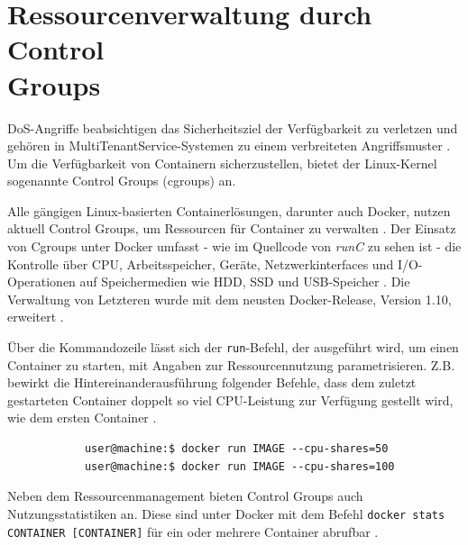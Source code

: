 \documentclass[../main.tex]{subfiles}
\begin{document}
	\section{Ressourcenverwaltung durch Control\\Groups}
  \label{secCgroups}
		\acrshort{DoS}-Angriffe beabsichtigen das Sicherheitsziel der Verfügbarkeit zu verletzen und gehören in \gls{MultiTenantService}-Systemen zu einem verbreiteten Angriffsmuster \cite[S.5]{dockerSec1}. Um die Verfügbarkeit von Containern sicherzustellen, bietet der Linux-Kernel sogenannte Control Groups (\acrshort{cgroups}) an.

		Alle gängigen Linux-basierten Containerlösungen, darunter auch Docker, nutzen aktuell Control Groups, um Ressourcen für Container zu verwalten \cite[S.16]{dockerSec2}. Der Einsatz von Cgroups unter Docker umfasst - wie im Quellcode von \emph{runC} zu sehen ist - die Kontrolle über \acrshort{CPU}, Arbeitsspeicher, Geräte, Netzwerkinterfaces und \acrshort{I/O}-Operationen auf Speichermedien wie \acrshort{HDD}, \acrshort{SSD} und \acrshort{USB}-Speicher \cite{cgroupsRedhat}\cite{githubRunCCgroups}. Die Verwaltung von Letzteren wurde mit dem neusten Docker-Release, Version 1.10, erweitert \cite{docker110}.


		Über die Kommandozeile lässt sich der \texttt{run}-Befehl, der ausgeführt wird, um einen Container zu starten, mit Angaben zur Ressourcennutzung parametrisieren. Z.B. bewirkt die Hintereinanderausführung folgender Befehle, dass dem zuletzt gestarteten Container doppelt so viel CPU-Leistung zur Verfügung gestellt wird, wie dem ersten Container \cite{dockerRun}.

		\begin{lstlisting}
			user@machine:$ docker run IMAGE --cpu-shares=50
			user@machine:$ docker run IMAGE --cpu-shares=100
		\end{lstlisting}

		Neben dem Ressourcenmanagement bieten Control Groups auch Nutzungsstatistiken an. Diese sind unter Docker mit dem Befehl \texttt{docker stats CONTAINER [CONTAINER]} für ein oder mehrere Container abrufbar \cite{dockerMetrics}.
\end{document}
